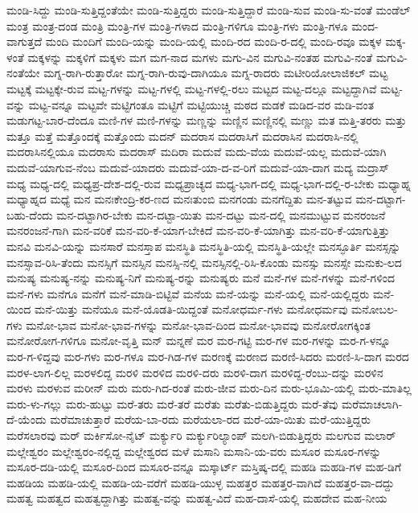 {ಮಂಡಿ-ಸಿದ್ದು
ಮಂಡಿ-ಸುತ್ತಿದ್ದಂತೆಯೇ
ಮಂಡಿ-ಸುತ್ತಿದ್ದರು
ಮಂಡಿ-ಸುತ್ತಿದ್ದಾರೆ
ಮಂಡಿ-ಸುವ
ಮಂಡಿ-ಸು-ವಂತೆ
ಮಂಡೆಲ್
ಮಂತ್ರ
ಮಂತ್ರ-ದಂಡ
ಮಂತ್ರಿ
ಮಂತ್ರಿ-ಗಳ
ಮಂತ್ರಿ-ಗಳಾದ
ಮಂತ್ರಿ-ಗಳಿಗೂ
ಮಂತ್ರಿ-ಗಳು
ಮಂತ್ರಿ-ಗಳೂ
ಮಂದ-ವಾಗುತ್ತದೆ
ಮಂದಿ
ಮಂದಿಗೆ
ಮಂದಿ-ಯನ್ನು
ಮಂದಿ-ಯಲ್ಲಿ
ಮಂದಿ-ರದ
ಮಂದಿ-ರ-ದಲ್ಲಿ
ಮಂದಿ-ರವೂ
ಮಕ್ಕಳ
ಮಕ್ಕ-ಳಂತೆ
ಮಕ್ಕಳನ್ನು
ಮಕ್ಕಳಿಗೆ
ಮಕ್ಕಳು
ಮಗ
ಮಗ-ನಾದ
ಮಗಳು
ಮಗು-ವಿನ
ಮಗುವಿ-ನಂತಹ
ಮಗುವಿ-ನಂತೆ
ಮಗುವಿ-ನಂತೆಯೇ
ಮಗ್ನ-ರಾಗಿ-ರುತ್ತಾರೋ
ಮಗ್ನ-ರಾಗಿ-ರುವು-ದಾಗಿಯೂ
ಮಗ್ನ-ರಾದರು
ಮಟೀರಿಯೋಲಾಜಿಕಲ್
ಮಟ್ಟ
ಮಟ್ಟಕ್ಕೆ
ಮಟ್ಟಕ್ಕೇ-ರುವ
ಮಟ್ಟ-ಗಳನ್ನು
ಮಟ್ಟ-ಗಳಲ್ಲಿ
ಮಟ್ಟ-ಗಳಲ್ಲಿ-ರಲು
ಮಟ್ಟದ
ಮಟ್ಟ-ದಲ್ಲೂ
ಮಟ್ಟದ್ದಾಗಿವೆ
ಮಟ್ಟ-ವನ್ನು
ಮಟ್ಟ-ವನ್ನೂ
ಮಟ್ಟವೇ
ಮಟ್ಟಿಗಂತೂ
ಮಟ್ಟಿಗೆ
ಮಟ್ಟಿಯುಚ್ಚಿ
ಮಠದ
ಮಡಕೆ
ಮಡಿದ-ವರ
ಮಡಿ-ವಂತ
ಮಡುಗಟ್ಟ-ಬಾರ-ದೆಂದೂ
ಮಣಿ-ಗಳ
ಮಣಿ-ಗಳನ್ನು
ಮಣ್ಣನ್ನು
ಮಣ್ಣಿನ
ಮಣ್ಣಿನಲ್ಲಿ
ಮಣ್ಣು
ಮತ
ಮತ್ತಿ-ತರರು
ಮತ್ತು
ಮತ್ತೂ
ಮತ್ತೆ
ಮತ್ತೊಂದಕ್ಕೆ
ಮತ್ತೊಂದು
ಮದನ್
ಮದರಾಸ
ಮದರಾಸಿಗೆ
ಮದರಾಸಿನ
ಮದರಾಸಿ-ನಲ್ಲಿ
ಮದರಾಸಿನಲ್ಲಿಯೂ
ಮದರಾಸು
ಮದರಾಸ್
ಮದಿರಾ
ಮದುವೆ
ಮದು-ವೆಯ
ಮದುವೆ-ಯಲ್ಲ
ಮದುವೆ-ಯಾಗಿ
ಮದುವೆ-ಯಾಗುವ-ನೆಂಬ
ಮದುವೆ-ಯಾದರು
ಮದುವೆ-ಯಾ-ದ-ವ-ರಿಗೆ
ಮದುವೆ-ಯಾ-ದಾಗ
ಮದ್ಯ
ಮದ್ರಾಸ್
ಮಧ್ಯ
ಮಧ್ಯ-ದಲ್ಲಿ
ಮಧ್ಯಪ್ರ-ದೇಶ-ದಲ್ಲಿ-ರುವ
ಮಧ್ಯಪ್ರಾಚ್ಯದ
ಮಧ್ಯ-ಭಾಗ-ದಲ್ಲಿ
ಮಧ್ಯ-ಭಾಗ-ದಲ್ಲಿ-ರ-ಬೇಕು
ಮಧ್ಯಾಹ್ನ
ಮಧ್ಯಾಹ್ನದ
ಮಧ್ಯೆ
ಮನ
ಮನಃಕೇಂದ್ರಿ-ಕರ-ಣದ
ಮನಃತುಂಬಿ
ಮನಗಂಡು
ಮನಗೆದ್ದಿತು
ಮನ-ತಟ್ಟುವ
ಮನ-ದಟ್ಟಾಗ-ಬಹು-ದೆಂದು
ಮನ-ದಟ್ಟಾಗಿರ-ಬೇಕು
ಮನ-ದಟ್ಟಾ-ಯಿತು
ಮನ-ದಟ್ಟು
ಮನ-ದಲ್ಲಿ
ಮನಮುಟ್ಟುವ
ಮನರಂಜನೆ
ಮನರಂಜನೆ-ಗಾಗಿ
ಮನ-ವರಿಕೆ
ಮನ-ವರಿ-ಕೆ-ಯಾಗ-ಬೇಕಿದೆ
ಮನ-ವರಿ-ಕೆ-ಯಾಗಿತ್ತು
ಮನ-ವರಿ-ಕೆ-ಯಾಗುತ್ತಿತ್ತು
ಮನವಿ
ಮನವಿ-ಯನ್ನು
ಮನಸಾರೆ
ಮನಸ್ತಾಪ
ಮನಸ್ಥಿತಿ
ಮನಸ್ಥಿತಿ-ಯಲ್ಲಿ
ಮನಸ್ಥಿತಿ-ಯಲ್ಲೇ
ಮನಸ್ಫೂರ್ತಿ
ಮನಸ್ಸನ್ನು
ಮನಸ್ಸಾವ-ರಿಸಿ-ತೆಂದು
ಮನಸ್ಸಿಗೆ
ಮನಸ್ಸಿನ
ಮನಸ್ಸಿ-ನಲ್ಲಿ
ಮನಸ್ಸಿನಲ್ಲಿ-ರಿಸಿ-ಕೊಂಡು
ಮನಸ್ಸು
ಮನಸ್ಸೇ
ಮನುಕು-ಲದ
ಮನುಷ್ಯ
ಮನುಷ್ಯ-ನನ್ನು
ಮನುಷ್ಯ-ನಿಗೆ
ಮನುಷ್ಯ-ರನ್ನು
ಮನುಷ್ಯರು
ಮನೆ
ಮನೆ-ಗಳ
ಮನೆ-ಗಳನ್ನು
ಮನೆ-ಗಳಿಂದ
ಮನೆ-ಗಳು
ಮನೆಗೂ
ಮನೆಗೆ
ಮನೆ-ಮಾಡಿ-ಬಿಟ್ಟಿವೆ
ಮನೆಯ
ಮನೆ-ಯನ್ನು
ಮನೆ-ಯಲ್ಲಿ
ಮನೆ-ಯಲ್ಲಿದ್ದರು
ಮನೆ-ಯಿಂದ
ಮನೆ-ಯಿತ್ತು
ಮನೆಯೂ
ಮನೆ-ಯೊಡತಿ-ಯಿದ್ದಂತೆ
ಮನೋಧರ್ಮ-ಗಳು
ಮನೋಧರ್ಮವು
ಮನೋಬಲ-ಗಳು
ಮನೋ-ಭಾವ
ಮನೋ-ಭಾವ-ಗಳನ್ನು
ಮನೋ-ಭಾವ-ದಿಂದ
ಮನೋ-ಭಾವವು
ಮನೋರೋಗಕ್ಕಿಂತ
ಮನೋರೋಗ-ಗಳಿಗೂ
ಮನೋ-ವೃತ್ತಿ
ಮನ್
ಮನ್ನಣೆ
ಮರ
ಮರ-ಗಟ್ಟಿ
ಮರ-ಗಳ
ಮರ-ಗಳನ್ನು
ಮರ-ಗ-ಳನ್ನೂ
ಮರ-ಗ-ಳಿದ್ದವು
ಮರ-ಗಳು
ಮರ-ಗಳೂ
ಮರ-ಗಿಡ-ಗಳ
ಮರಣಕ್ಕೆ
ಮರಣದ
ಮರಣಿ-ಸಿದರು
ಮರಣಿ-ಸಿ-ದಾಗ
ಮರದ
ಮರಳ-ಲಾಗ-ಲಿಲ್ಲ
ಮರಳಲಿದ್ದ
ಮರಳಿ
ಮರಳಿದ
ಮರಳಿ-ದರು
ಮರಳಿ-ದಾಗ
ಮರಳಿದ್ದ-ರೆಂಬು-ದನ್ನು
ಮರಳಿನ
ಮರಳು
ಮರಳುವ
ಮರೀನ್
ಮರು
ಮರು-ಗಿದ-ರಂತೆ
ಮರು-ಜೀವ
ಮರು-ದಿನ
ಮರು-ಭೂಮಿ-ಯಲ್ಲಿ
ಮರು-ಮಾತಿಲ್ಲ
ಮರು-ಳು-ಗಲ್ಲು
ಮರು-ಹುಟ್ಟು
ಮರೆ-ತರು
ಮರೆ-ತರೆ
ಮರೆತು
ಮರೆತು-ಬಿಡುತ್ತಿದ್ದರು
ಮರೆ-ತೆವು
ಮರೆಮಾಚಲಾಗಿ-ದೆ-ಯೆಂದು
ಮರೆಮಾಚುತ್ತಾರೆ
ಮರೆಯ-ಬಾ-ರದು
ಮರೆಯಲಾ-ರದ
ಮರೆ-ಯಾ-ಯಿತು
ಮರೆ-ಯುತ್ತಿದ್ದರು
ಮರೆಸಲಾರವು
ಮರ್
ಮರ್ಕಿಸೋ-ನೈಟ್
ಮರ್ಕ್ಯುರಿ
ಮರ್ಕ್ಯುರಿಲ್ಯಾಂಪ್
ಮಲಗಿ-ಬಿಡುತ್ತಿದ್ದರು
ಮಲಗುವ
ಮಲಾರ್
ಮಲ್ಲೇಶ್ವರಂ
ಮಲ್ಲೇಶ್ವರಂ-ನಲ್ಲಿದ್ದ
ಮಲ್ಲೇಶ್ವರದ
ಮಳೆ
ಮಸಾನಿ
ಮಸಾನಿ-ಯ-ವರು
ಮಸೂರ
ಮಸೂರ-ಗಳನ್ನು
ಮಸೂರ-ದಡಿ-ಯಲ್ಲಿ
ಮಸೂರ-ದಿಂದ
ಮಸೂರ-ವನ್ನೂ
ಮಸ್ಕಾರ್ಟ್
ಮಸ್ತಿಷ್ಕ-ದಲ್ಲಿ
ಮಹಡಿ
ಮಹಡಿ-ಗಳ
ಮಹ-ಡಿಗೆ
ಮಹಡಿಯ
ಮಹಡಿ-ಯಲ್ಲಿ
ಮಹಡಿ-ಯ-ವರೆಗೆ
ಮಹಡಿ-ಯುಳ್ಳ
ಮಹತ್ತರ
ಮಹತ್ತರ-ವಾಗಿದೆ
ಮಹತ್ತರ-ವಾ-ದದ್ದು
ಮಹತ್ವ
ಮಹತ್ವದ
ಮಹತ್ವದ್ದಾಗಿತ್ತು
ಮಹತ್ವ-ವನ್ನು
ಮಹತ್ವ-ವಿದೆ
ಮಹ-ದಾಸೆ-ಯಲ್ಲಿ
ಮಹದೇವ
ಮಹ-ನೀಯ
}
